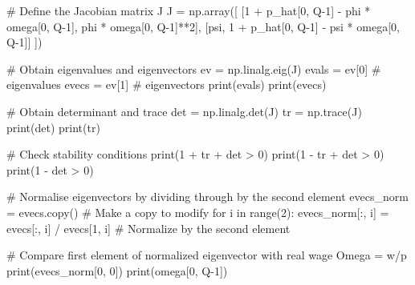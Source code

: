 \documentclass[
  letterpaper,
  DIV=11,
  numbers=noendperiod]{scrreprt}
\newenvironment{Shaded}{\begin{snugshade}}{\end{snugshade}}
\newcommand{\BuiltInTok}[1]{\textcolor[rgb]{0.00,0.23,0.31}{#1}}
\newcommand{\CommentTok}[1]{\textcolor[rgb]{0.37,0.37,0.37}{#1}}
\newcommand{\ControlFlowTok}[1]{\textcolor[rgb]{0.00,0.23,0.31}{#1}}
\newcommand{\DecValTok}[1]{\textcolor[rgb]{0.68,0.00,0.00}{#1}}
\newcommand{\KeywordTok}[1]{\textcolor[rgb]{0.00,0.23,0.31}{#1}}
\newcommand{\NormalTok}[1]{\textcolor[rgb]{0.00,0.23,0.31}{#1}}
\newcommand{\OperatorTok}[1]{\textcolor[rgb]{0.37,0.37,0.37}{#1}}
\begin{document}
\begin{tcolorbox}
\begin{Shaded}
\begin{Highlighting}[]
\CommentTok{\# Define the Jacobian matrix J}
\NormalTok{J }\OperatorTok{=}\NormalTok{ np.array([}
\NormalTok{    [}\DecValTok{1} \OperatorTok{+}\NormalTok{ p\_hat[}\DecValTok{0}\NormalTok{, Q}\OperatorTok{{-}}\DecValTok{1}\NormalTok{] }\OperatorTok{{-}}\NormalTok{ phi }\OperatorTok{*}\NormalTok{ omega[}\DecValTok{0}\NormalTok{, Q}\OperatorTok{{-}}\DecValTok{1}\NormalTok{], phi }\OperatorTok{*}\NormalTok{ omega[}\DecValTok{0}\NormalTok{, Q}\OperatorTok{{-}}\DecValTok{1}\NormalTok{]}\OperatorTok{**}\DecValTok{2}\NormalTok{],}
\NormalTok{    [psi, }\DecValTok{1} \OperatorTok{+}\NormalTok{ p\_hat[}\DecValTok{0}\NormalTok{, Q}\OperatorTok{{-}}\DecValTok{1}\NormalTok{] }\OperatorTok{{-}}\NormalTok{ psi }\OperatorTok{*}\NormalTok{ omega[}\DecValTok{0}\NormalTok{, Q}\OperatorTok{{-}}\DecValTok{1}\NormalTok{]]}
\NormalTok{])}

\CommentTok{\# Obtain eigenvalues and eigenvectors}
\NormalTok{ev }\OperatorTok{=}\NormalTok{ np.linalg.eig(J)}
\NormalTok{evals }\OperatorTok{=}\NormalTok{ ev[}\DecValTok{0}\NormalTok{]  }\CommentTok{\# eigenvalues}
\NormalTok{evecs }\OperatorTok{=}\NormalTok{ ev[}\DecValTok{1}\NormalTok{]  }\CommentTok{\# eigenvectors}
\BuiltInTok{print}\NormalTok{(evals)}
\BuiltInTok{print}\NormalTok{(evecs)}

\CommentTok{\# Obtain determinant and trace}
\NormalTok{det }\OperatorTok{=}\NormalTok{ np.linalg.det(J)}
\NormalTok{tr }\OperatorTok{=}\NormalTok{ np.trace(J)}
\BuiltInTok{print}\NormalTok{(det)}
\BuiltInTok{print}\NormalTok{(tr)}

\CommentTok{\# Check stability conditions}
\BuiltInTok{print}\NormalTok{(}\DecValTok{1} \OperatorTok{+}\NormalTok{ tr }\OperatorTok{+}\NormalTok{ det }\OperatorTok{\textgreater{}} \DecValTok{0}\NormalTok{)}
\BuiltInTok{print}\NormalTok{(}\DecValTok{1} \OperatorTok{{-}}\NormalTok{ tr }\OperatorTok{+}\NormalTok{ det }\OperatorTok{\textgreater{}} \DecValTok{0}\NormalTok{)}
\BuiltInTok{print}\NormalTok{(}\DecValTok{1} \OperatorTok{{-}}\NormalTok{ det }\OperatorTok{\textgreater{}} \DecValTok{0}\NormalTok{)}

\CommentTok{\# Normalise eigenvectors by dividing through by the second element}
\NormalTok{evecs\_norm }\OperatorTok{=}\NormalTok{ evecs.copy()  }\CommentTok{\# Make a copy to modify}
\ControlFlowTok{for}\NormalTok{ i }\KeywordTok{in} \BuiltInTok{range}\NormalTok{(}\DecValTok{2}\NormalTok{):}
\NormalTok{    evecs\_norm[:, i] }\OperatorTok{=}\NormalTok{ evecs[:, i] }\OperatorTok{/}\NormalTok{ evecs[}\DecValTok{1}\NormalTok{, i]  }\CommentTok{\# Normalize by the second element}

\CommentTok{\# Compare first element of normalized eigenvector with real wage Omega = w/p}
\BuiltInTok{print}\NormalTok{(evecs\_norm[}\DecValTok{0}\NormalTok{, }\DecValTok{0}\NormalTok{])}
\BuiltInTok{print}\NormalTok{(omega[}\DecValTok{0}\NormalTok{, Q}\OperatorTok{{-}}\DecValTok{1}\NormalTok{])}
\end{Highlighting}
\end{Shaded}

\end{tcolorbox}
\end{document}
